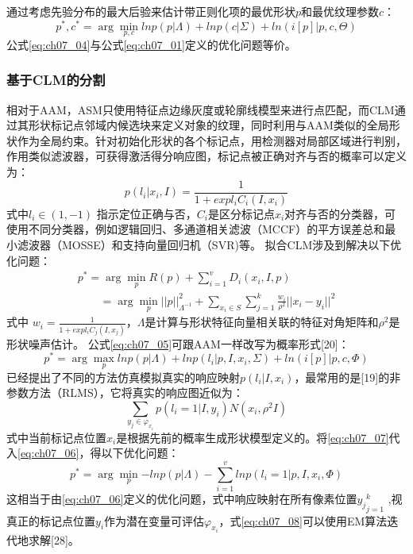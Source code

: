 通过考虑先验分布的最大后验来估计带正则化项的最优形状$p$和最优纹理参数$c$：
\begin{equation}\label{eq:ch07_04}
    p^*,c^*=\arg \min_{p,c}{ lnp(p|\Lambda)+lnp(c|\Sigma)+ln(i[p]|p,c,\Theta)}
\end{equation}         
 公式\ref{eq:ch07_04}与公式\ref{eq:ch07_01}定义的优化问题等价。
\subsubsection{基于CLM的分割}
相对于AAM，ASM只使用特征点边缘灰度或轮廓线模型来进行点匹配，而CLM通过其形状标记点邻域内候选块来定义对象的纹理，同时利用与AAM类似的全局形状作为全局约束。针对初始化形状的各个标记点，用检测器对局部区域进行判别，作用类似滤波器，可获得激活得分响应图，标记点被正确对齐与否的概率可以定义为：
\begin{equation}\label{eq:ch07_05}
    p(l_i|x_i,I)=\frac{1}{1+exp{l_i C_i (I,x_i)}}
\end{equation}  
式中$l_i\in (1,-1)$ 指示定位正确与否，$C_i$是区分标记点$x_i$对齐与否的分类器，可使用不同分类器，例如逻辑回归\cite{}、多通道相关滤波（MCCF）的平方误差总和最小滤波器（MOSSE）\cite{}和支持向量回归机（SVR)\cite{}等。
拟合CLM涉及到解决以下优化问题\cite{}： 
\begin{equation}\label{eq:ch07_06}
\begin{aligned}
p^*=\arg \min_{p}{R(p)+\sum_{i=1}^v D_i(x_i,I,p)} \\
\qquad =\arg \min_{p}{||p||_{ \Lambda^{-1}}^2+\sum_{x_i \in S}\sum_{j=1}^{k} \frac{w_i}{\rho^2}||x_i-y_i||^2}
\end{aligned}
\end{equation}        
式中 $w_i=\frac{1}{1+exp{l_i C_j (I,x_j)}}$，$\Lambda$是计算与形状特征向量相关联的特征对角矩阵和$\rho^2$是形状噪声估计。
公式\ref{eq:ch07_05}可跟AAM一样改写为概率形式\cite{}[20]：
\begin{equation}\label{eq:ch07_07}
    p^*=\arg \max_{p}{ ln p(p|\Lambda)+ln p(l_i|p,I,x_i,\Sigma)+ln(i[p]|p,c,\Phi)}
\end{equation}          
已经提出了不同的方法仿真模拟真实的响应映射$p(l_i|I,x_i)$，最常用的是[19]的非参数方法（RLMS），它将真实的响应图近似为： 
\begin{equation}\label{eq:ch07_08}
    \sum_{y_j\in \varphi_{x_i}}p(l_i=1|I,y_i)N(x_i,\rho^2 I)
\end{equation} 
式中当前标记点位置$x_i$是根据先前的概率生成形状模型定义的。将\ref{eq:ch07_07}代入\ref{eq:ch07_06}，得以下优化问题：
\begin{equation}\label{eq:ch07_09}
   p^*=\arg \min_p{-ln p(p|\Lambda)-\sum_{i=1}^{v} ln p(l_i=1|p,I,x_i,\Phi)}
\end{equation} 
这相当于由\ref{eq:ch07_06}定义的优化问题，式中响应映射在所有像素位置${y_j}_{j=1}^{k}$ ,视真正的标记点位置$y_i$作为潜在变量可评估$\varphi_{x_i}$，式\ref{eq:ch07_08}可以使用EM算法迭代地求解[28]。
         
